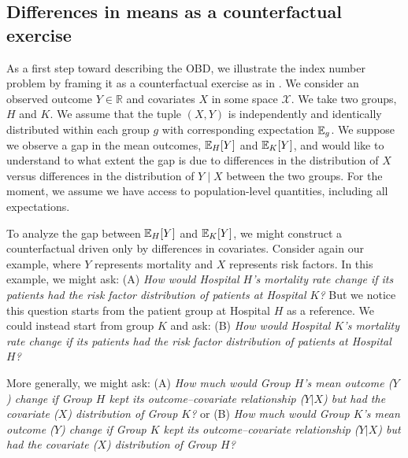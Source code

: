 \subsection{Differences in means as a counterfactual exercise} 
\label{sec:counterfactual_example}

As a first step toward describing the OBD, we illustrate the index number problem by framing it as a counterfactual exercise as in \citet{fortinLemieuxFirpo2011}.
We consider an observed outcome $Y \in \mathbb{R}$ and covariates $X$ in some space $\mathcal{X}$. We take two groups, $H$ and $K$. We assume that the tuple $(X,Y)$ is independently and identically distributed within each group $g$ with corresponding expectation $\mathbb{E}_g$. We suppose we observe a gap in the mean outcomes, $\mathbb{E}_H[Y]$ and $\mathbb{E}_K[Y]$, and would like to understand to what extent the gap is due to differences in the distribution of $X$ versus differences in the distribution of $Y\mid X$ between the two groups. 
For the moment, we assume we have access to population-level quantities, including all expectations.

To analyze the gap between $\mathbb{E}_H[Y]$ and $\mathbb{E}_K[Y]$, we might construct a counterfactual driven only by differences in covariates.
Consider again our example, where $Y$ represents mortality and $X$ represents risk factors.
In this example, we might ask:
(A) \emph{How would Hospital $H$'s mortality rate change if its patients had the risk factor distribution of patients at Hospital $K$?}
But we notice this question starts from the patient group at Hospital $H$ as a reference. We could instead start from group $K$ and ask:
(B) \emph{How would Hospital $K$'s mortality rate change if its patients had the risk factor distribution of patients at Hospital $H$?}


More generally, we might ask:
(A) \emph{How much would Group $H$'s mean outcome ($Y$) change if Group $H$ kept its outcome--covariate relationship ($Y|X$) but had the covariate ($X$) distribution of Group $K$?}
or 
(B) \emph{How much would Group $K$'s mean outcome ($Y$) change if Group $K$ kept its outcome--covariate relationship ($Y|X$) but had the covariate ($X$) distribution of Group $H$?}

